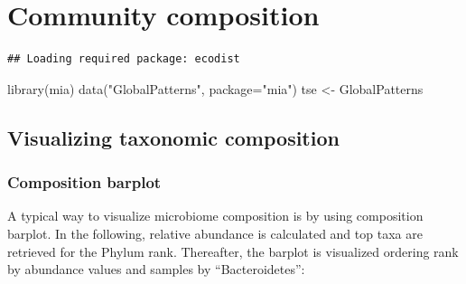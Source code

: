 \documentclass[
]{book}
\newenvironment{Shaded}{\begin{snugshade}}{\end{snugshade}}
\newcommand{\AttributeTok}[1]{\textcolor[rgb]{0.77,0.63,0.00}{#1}}
\newcommand{\FunctionTok}[1]{\textcolor[rgb]{0.00,0.00,0.00}{#1}}
\newcommand{\NormalTok}[1]{#1}
\newcommand{\OtherTok}[1]{\textcolor[rgb]{0.56,0.35,0.01}{#1}}
\newcommand{\StringTok}[1]{\textcolor[rgb]{0.31,0.60,0.02}{#1}}
\begin{document}
\hypertarget{microbiome-community}{%
\chapter{Community composition}\label{microbiome-community}}

\begin{verbatim}
## Loading required package: ecodist
\end{verbatim}

\begin{Shaded}
\begin{Highlighting}[]
\FunctionTok{library}\NormalTok{(mia)}
\FunctionTok{data}\NormalTok{(}\StringTok{"GlobalPatterns"}\NormalTok{, }\AttributeTok{package=}\StringTok{"mia"}\NormalTok{)}
\NormalTok{tse }\OtherTok{\textless{}{-}}\NormalTok{ GlobalPatterns}
\end{Highlighting}
\end{Shaded}

\hypertarget{visual-composition}{%
\section{Visualizing taxonomic composition}\label{visual-composition}}

\hypertarget{composition-barplot}{%
\subsection{Composition barplot}\label{composition-barplot}}

A typical way to visualize microbiome composition is by using
composition barplot. In the following, relative abundance is
calculated and top taxa are retrieved for the Phylum rank. Thereafter,
the barplot is visualized ordering rank by abundance values and
samples by ``Bacteroidetes'':
\end{document}
